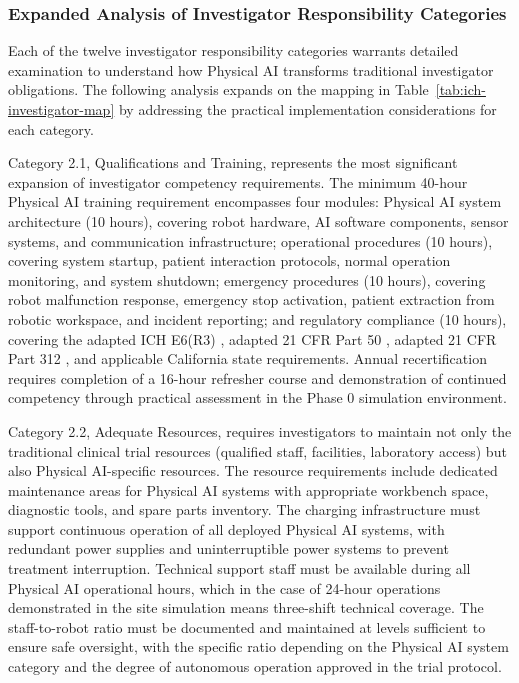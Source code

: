 
\subsubsection{Expanded Analysis of Investigator Responsibility Categories}

Each of the twelve investigator responsibility categories warrants detailed
examination to understand how Physical AI transforms traditional
investigator obligations. The following analysis expands on the mapping in
Table~\ref{tab:ich-investigator-map} by addressing the practical
implementation considerations for each category.

Category 2.1, Qualifications and Training, represents the most significant
expansion of investigator competency requirements. The minimum 40-hour
Physical AI training requirement encompasses four modules: Physical AI
system architecture (10 hours), covering robot hardware, AI software
components, sensor systems, and communication infrastructure; operational
procedures (10 hours), covering system startup, patient interaction
protocols, normal operation monitoring, and system shutdown; emergency
procedures (10 hours), covering robot malfunction response, emergency stop
activation, patient extraction from robotic workspace, and incident
reporting; and regulatory compliance (10 hours), covering the adapted ICH
E6(R3) \cite{ich-adapt}, adapted 21 CFR Part 50 \cite{cfr50-adapt}, adapted
21 CFR Part 312 \cite{cfr312-adapt}, and applicable California state
requirements. Annual recertification requires completion of a 16-hour
refresher course and demonstration of continued competency through practical
assessment in the Phase 0 simulation environment.

Category 2.2, Adequate Resources, requires investigators to maintain not only
the traditional clinical trial resources (qualified staff, facilities,
laboratory access) but also Physical AI-specific resources. The resource
requirements include dedicated maintenance areas for Physical AI systems with
appropriate workbench space, diagnostic tools, and spare parts inventory. The
charging infrastructure must support continuous operation of all deployed
Physical AI systems, with redundant power supplies and uninterruptible power
systems to prevent treatment interruption. Technical support staff must be
available during all Physical AI operational hours, which in the case of
24-hour operations demonstrated in the site simulation \cite{site-docs}
means three-shift technical coverage. The staff-to-robot ratio must be
documented and maintained at levels sufficient to ensure safe oversight,
with the specific ratio depending on the Physical AI system category and
the degree of autonomous operation approved in the trial protocol.

